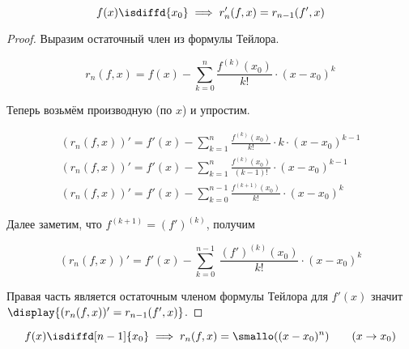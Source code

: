 \begin{lemma} \label{lem:der-rem-term}
  \begin{equation*}
    f(x) \isdiffd{x_0} \implies r'_n(f, x) = r_{n - 1}(f', x)
  \end{equation*}
\end{lemma}

\begin{proof}
  Выразим остаточный член из формулы Тейлора.

  \begin{equation*}
    r_n(f, x) = f(x) - \sum_{k = 0}^n \frac{f^{(k)}(x_0)}{k!} \cdot (x - x_0)^k
  \end{equation*}

  Теперь возьмём производную (по \(x\)) и упростим.

  \begin{equation*}
    \begin{aligned}
      (r_n(f, x))' = f'(x) - \sum_{k = 1}^n \frac{f^{(k)}(x_0)}{k!} \cdot k
        \cdot (x - x_0)^{k - 1}
    \\
      (r_n(f, x))' = f'(x) - \sum_{k = 1}^n \frac{f^{(k)}(x_0)}{(k - 1)!}
        \cdot (x - x_0)^{k - 1}
    \\
      (r_n(f, x))' = f'(x) - \sum_{k = 0}^{n - 1} \frac{f^{(k + 1)}(x_0)}{k!}
        \cdot (x - x_0)^k
    \end{aligned}
  \end{equation*}

  Далее заметим, что \(f^{(k + 1)} = (f')^{(k)}\), получим

  \begin{equation*}
    (r_n(f, x))' = f'(x) - \sum_{k = 0}^{n - 1}\ \frac{(f')^{(k)}(x_0)}{k!}
      \cdot (x - x_0)^k
  \end{equation*}

  Правая часть является остаточным членом формулы Тейлора для \(f'(x)\) значит
  \(\display{(r_n(f, x))' = r_{n - 1}(f', x)}\).
\end{proof}

\begin{theorem}
  \begin{equation*}
    f(x) \isdiffd[n - 1]{x_0}
    \implies
    r_n(f, x) = \smallo((x - x_0)^n)
    \qquad
    (x \to x_0)
  \end{equation*}
\end{theorem}

